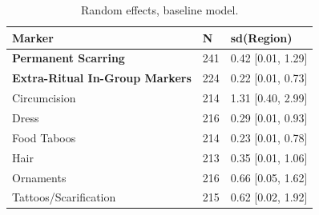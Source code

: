 \begin{table}[!ht]
\centering
\small
\caption{Random effects, baseline model.}
\label{tab:int_random_effects_baseline}
\begin{tabular}{lll}
\toprule
Marker & N & sd(Region) \\
\midrule
\textbf{Permanent Scarring} & 241 & 0.42 [0.01, 1.29] \\
\textbf{Extra-Ritual In-Group Markers} & 224 & 0.22 [0.01, 0.73] \\
\midrule
Circumcision & 214 & 1.31 [0.40, 2.99] \\
Dress & 216 & 0.29 [0.01, 0.93] \\
Food Taboos & 214 & 0.23 [0.01, 0.78] \\
Hair & 213 & 0.35 [0.01, 1.06] \\
Ornaments & 216 & 0.66 [0.05, 1.62] \\
Tattoos/Scarification & 215 & 0.62 [0.02, 1.92] \\
\bottomrule
\end{tabular}
\end{table}